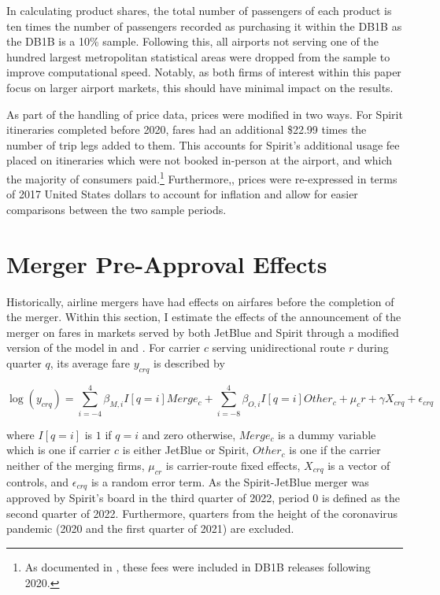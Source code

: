 \documentclass{article}
\begin{document}
\begin{appendices}
	In calculating product shares, the total number of passengers of each product is ten times the number of passengers recorded as purchasing it within the DB1B as the DB1B is a 10\% sample. Following this, all airports not serving one of the hundred largest metropolitan statistical areas were dropped from the sample to improve computational speed. Notably, as both firms of interest within this paper focus on larger airport markets, this should have minimal impact on the results.  
	
	
	As part of the handling of price data, prices were modified in two ways. For Spirit itineraries completed before 2020, fares had an additional \$22.99 times the number of trip legs added to them. This accounts for Spirit's additional usage fee placed on itineraries which were not booked in-person at the airport, and which the majority of consumers paid.\footnote{As documented in \citet{shrago_spirit_2024}, these fees were included in DB1B releases following 2020.} Furthermore,, prices were re-expressed in terms of 2017 United States dollars to account for inflation and allow for easier comparisons between the two sample periods.

    \FloatBarrier
    \section{Merger Pre-Approval Effects}
    \setcounter{table}{0}
    \setcounter{figure}{0}

    Historically, airline mergers have had effects on airfares before the completion of the merger. Within this section, I estimate the effects of the announcement of the merger on fares in markets served by both JetBlue and Spirit through a modified version of the model in \citet{goolsbee_how_2008} and \citet{fan_when_2020}. For carrier $c$ serving unidirectional route $r$ during quarter $q$, its average fare $y_{crq}$ is described by 

    \[\log(y_{crq}) = \sum_{i = - 4}^{4} \beta_{M,i}I[q = i] Merge_{c} + \sum_{i = - 8}^{4} \beta_{O,i}I[q = i] Other_{c}  + \mu_cr + \gamma X_{crq}+ \epsilon_{crq}\]

    where $I[q = i]$ is $1$ if $q = i$ and zero otherwise, $Merge_{c}$ is a dummy variable which is one if carrier $c$ is either JetBlue or Spirit, $Other_c$ is one if the carrier neither of the merging firms, $\mu_{cr}$ is carrier-route fixed effects, $X_{crq}$ is a vector of controls, and $\epsilon_{crq}$ is a random error term. As the Spirit-JetBlue merger was approved by Spirit's board in the third quarter of 2022, period $0$ is defined as the second quarter of 2022. Furthermore, quarters from the height of the coronavirus pandemic (2020 and the first quarter of 2021) are excluded. 


\end{appendices}
\end{document}
